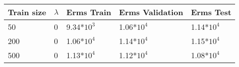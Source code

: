 \def\arraystretch{1.25}
\begin{center}
\begin{longtable}{l l l l l}
\hline
\hline
\textbf{Train size} & \textbf{$\lambda$} & \textbf{Erms Train} & \textbf{Erms Validation} & \textbf{Erms Test}\\
\hline
\hline
50 & 0 & 9.34*$10^3$ & 1.06*$10^4$ & 1.14*$10^4$  \\
200 & 0 & 1.06*$10^4$ & 1.14*$10^4$ & 1.15*$ 10^4$  \\
500 & 0 & 1.13*$10^4$ & 1.12*$10^4$ & 1.08*$10^4$\\
\hline
\end{longtable}
\setcounter{table}{0}
\end{center}

